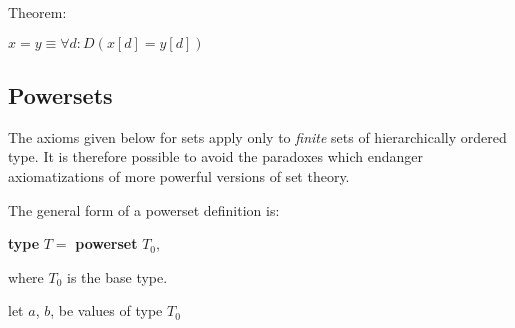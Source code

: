 \noindent
Theorem:

$x = y \equiv \forall d:D(x[d] = y[d])$

\subsection{Powersets}

The axioms given below for sets apply only to \textit{finite} sets of hierarchically ordered type. It is therefore possible to avoid the paradoxes which endanger axiomatizations of more powerful versions of set theory.

The general form of a powerset definition is:

\quad \textbf{type} $T =$ \textbf{powerset} $T_0$,

\noindent
where $T_0$ is the base type.

\noindent
let $a$, $b$, be values of type $T_0$


